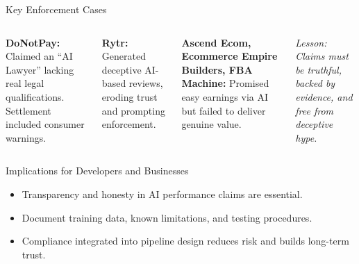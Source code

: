 \documentclass[aspectratio=169]{beamer}
\begin{document}
\begin{frame}{Key Enforcement Cases}
\begin{columns}[T,onlytextwidth]
\textbf{DoNotPay:} Claimed an “AI Lawyer” lacking real legal qualifications. Settlement included consumer warnings.

\vspace{0.5em}
\textbf{Rytr:} Generated deceptive AI-based reviews, eroding trust and prompting enforcement.

\textbf{Ascend Ecom, Ecommerce Empire Builders, FBA Machine:} Promised easy earnings via AI but failed to deliver genuine value.

\vspace{0.5em}
\textit{Lesson: Claims must be truthful, backed by evidence, and free from deceptive hype.}
\end{columns}
\end{frame}

\begin{frame}{Implications for Developers and Businesses}
\begin{itemize}
\item Transparency and honesty in AI performance claims are essential.
\item Document training data, known limitations, and testing procedures.
\item Compliance integrated into pipeline design reduces risk and builds long-term trust.
\end{itemize}
\end{frame}
\end{document}
